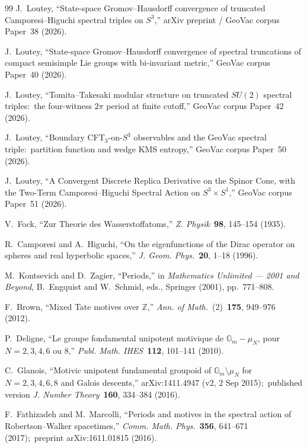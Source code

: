 \documentclass[11pt,a4paper]{article}
\theoremstyle{plain}
\theoremstyle{definition}
\newcommand{\sthree}{S^{3}}
\newcommand{\Z}{\mathbb{Z}}
\begin{document}
\begin{thebibliography}{99}
J.~Loutey, ``State-space Gromov--Hausdorff convergence of truncated
Camporesi--Higuchi spectral triples on $\sthree$,'' arXiv preprint /
GeoVac corpus Paper~38 (2026).

J.~Loutey, ``State-space Gromov--Hausdorff convergence of spectral
truncations of compact semisimple Lie groups with bi-invariant metric,'' GeoVac
corpus Paper~40 (2026).

J.~Loutey, ``Tomita--Takesaki modular structure on truncated $SU(2)$
spectral triples:\ the four-witness $2\pi$ period at finite cutoff,''
GeoVac corpus Paper~42 (2026).

J.~Loutey, ``Boundary CFT$_3$-on-$\sthree$ observables and the
GeoVac spectral triple:\ partition function and wedge KMS entropy,''
GeoVac corpus Paper~50 (2026).

J.~Loutey, ``A Convergent Discrete Replica Derivative on the Spinor Cone,
with the Two-Term Camporesi--Higuchi Spectral Action on
$S^3 \times S^1$,'' GeoVac corpus Paper~51 (2026).

V.~Fock, ``Zur Theorie des Wasserstoffatoms,''
\textit{Z. Physik}~\textbf{98}, 145--154 (1935).

R.~Camporesi and A.~Higuchi, ``On the eigenfunctions of the Dirac
operator on spheres and real hyperbolic spaces,''
\textit{J. Geom. Phys.}~\textbf{20}, 1--18 (1996).

M.~Kontsevich and D.~Zagier, ``Periods,'' in \textit{Mathematics
Unlimited --- 2001 and Beyond}, B.~Engquist and W.~Schmid, eds.,
Springer (2001), pp.~771--808.

F.~Brown, ``Mixed Tate motives over $\Z$,''
\textit{Ann. of Math.}~(2)~\textbf{175}, 949--976 (2012).

P.~Deligne, ``Le groupe fondamental unipotent motivique de
$\mathbb{G}_m - \mu_N$, pour $N = 2, 3, 4, 6$ ou $8$,''
\textit{Publ. Math. IHES}~\textbf{112}, 101--141 (2010).

C.~Glanois, ``Motivic unipotent fundamental groupoid of
$\mathbb{G}_m \setminus \mu_N$ for $N = 2, 3, 4, 6, 8$ and Galois
descents,'' arXiv:1411.4947 (v2, 2 Sep 2015);\ published version
\textit{J. Number Theory}~\textbf{160}, 334--384 (2016).

F.~Fathizadeh and M.~Marcolli, ``Periods and motives in the spectral
action of Robertson--Walker spacetimes,''
\textit{Comm. Math. Phys.}~\textbf{356}, 641--671 (2017);\ preprint
arXiv:1611.01815 (2016).


\end{thebibliography}
\end{document}
